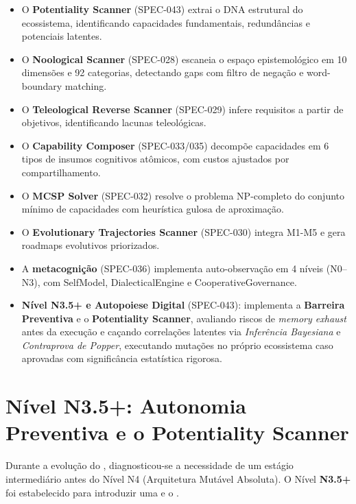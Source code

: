 \begin{itemize}
\item O \textbf{Potentiality Scanner} (SPEC-043) extrai o DNA estrutural
do ecossistema, identificando capacidades fundamentais, redundâncias e
potenciais latentes.
\item O \textbf{Noological Scanner} (SPEC-028) escaneia o espaço
epistemológico em 10 dimensões e 92 categorias, detectando gaps com
filtro de negação e word-boundary matching.
\item O \textbf{Teleological Reverse Scanner} (SPEC-029) infere requisitos
a partir de objetivos, identificando lacunas teleológicas.
\item O \textbf{Capability Composer} (SPEC-033/035) decompõe capacidades
em 6 tipos de insumos cognitivos atômicos, com custos ajustados por
compartilhamento.
\item O \textbf{MCSP Solver} (SPEC-032) resolve o problema NP-completo
do conjunto mínimo de capacidades com heurística gulosa de aproximação.
\item O \textbf{Evolutionary Trajectories Scanner} (SPEC-030) integra
M1-M5 e gera roadmaps evolutivos priorizados.
\item A \textbf{metacognição} (SPEC-036) implementa auto-observação em
4 níveis (N0--N3), com SelfModel, DialecticalEngine e
CooperativeGovernance.
\item \textbf{Nível N3.5+ e Autopoiese Digital} (SPEC-043): implementa a \textbf{Barreira Preventiva} e o \textbf{Potentiality Scanner}, avaliando riscos de \emph{memory exhaust} antes da execução e caçando correlações latentes via \emph{Inferência Bayesiana} e \emph{Contraprova de Popper}, executando mutações no próprio ecossistema caso aprovadas com significância estatística rigorosa.
\end{itemize}

\section{Nível N3.5+: Autonomia Preventiva e o Potentiality Scanner}

Durante a evolução do \opencodeeco{}, diagnosticou-se a necessidade de um estágio intermediário antes do Nível N4 (Arquitetura Mutável Absoluta). O Nível \textbf{N3.5+} foi estabelecido para introduzir uma  e o .

